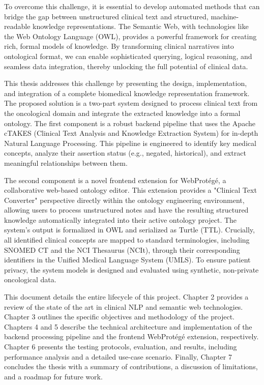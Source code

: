 \documentclass[12pt, a4paper]{article}
\begin{document}
To overcome this challenge, it is essential to develop automated methods that can bridge the gap between unstructured clinical text and structured, machine-readable knowledge representations. The Semantic Web, with technologies like the Web Ontology Language (OWL), provides a powerful framework for creating rich, formal models of knowledge. By transforming clinical narratives into ontological format, we can enable sophisticated querying, logical reasoning, and seamless data integration, thereby unlocking the full potential of clinical data.

This thesis addresses this challenge by presenting the design, implementation, and integration of a complete biomedical knowledge representation framework. The proposed solution is a two-part system designed to process clinical text from the oncological domain and integrate the extracted knowledge into a formal ontology. The first component is a robust backend pipeline that uses the Apache cTAKES (Clinical Text Analysis and Knowledge Extraction System) for in-depth Natural Language Processing. This pipeline is engineered to identify key medical concepts, analyze their assertion status (e.g., negated, historical), and extract meaningful relationships between them.

The second component is a novel frontend extension for WebProtégé, a collaborative web-based ontology editor. This extension provides a "Clinical Text Converter" perspective directly within the ontology engineering environment, allowing users to process unstructured notes and have the resulting structured knowledge automatically integrated into their active ontology project. The system's output is formalized in OWL and serialized as Turtle (TTL). Crucially, all identified clinical concepts are mapped to standard terminologies, including SNOMED CT and the NCI Thesaurus (NCIt), through their corresponding identifiers in the Unified Medical Language System (UMLS). To ensure patient privacy, the system models is designed and evaluated using synthetic, non-private oncological data.

This document details the entire lifecycle of this project. Chapter 2 provides a review of the state of the art in clinical NLP and semantic web technologies. Chapter 3 outlines the specific objectives and methodology of the project. Chapters 4 and 5 describe the technical architecture and implementation of the backend processing pipeline and the frontend WebProtégé extension, respectively. Chapter 6 presents the testing protocols, evaluation, and results, including performance analysis and a detailed use-case scenario. Finally, Chapter 7 concludes the thesis with a summary of contributions, a discussion of limitations, and a roadmap for future work.
\end{document}
